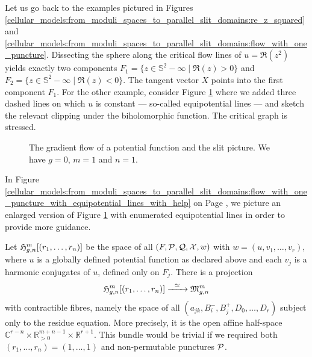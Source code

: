 Let us go back to the examples pictured in Figures \ref{cellular_models:from_moduli_spaces_to_parallel_slit_domains:re_z_squared} and
\ref{cellular_models:from_moduli_spaces_to_parallel_slit_domains:flow_with_one_puncture}.
Dissecting the sphere along the critical flow lines of $u = \Re(z^2)$ yields exactly two components $F_1  = \{ z \in \mathbb S^2 - \infty \mid \Re(z) > 0\}$ and $F_2 = \{ z \in \mathbb S^2 - \infty \mid \Re(z) < 0\}$.
The tangent vector $X$ points into the first component $F_1$.
For the other example, consider Figure \ref{cellular_models:from_moduli_spaces_to_parallel_slit_domains:flow_with_one_puncture_with_equipotential_lines}
where we added three dashed lines on which $u$ is constant --- so-called equipotential lines --- and sketch the relevant clipping under the biholomorphic function.
The critical graph is stressed.
\begin{figure}[ht]
    \centering
    \def\svgwidth{.72\columnwidth}
    \raisebox{-0.5\height}{}
    \hfill
    \def\svgwidth{.26\columnwidth}
    \raisebox{-0.5\height}{}
    \caption{
        \label{cellular_models:from_moduli_spaces_to_parallel_slit_domains:flow_with_one_puncture_with_equipotential_lines}
        The gradient flow of a potential function and the slit picture.
        We have $g=0$, $m=1$ and $n=1$.}
\end{figure}
In Figure \ref{cellular_models:from_moduli_spaces_to_parallel_slit_domains:flow_with_one_puncture_with_equipotential_lines_with_help} on Page \pageref{page:huge_picture_flow},
we picture an enlarged version of Figure \ref{cellular_models:from_moduli_spaces_to_parallel_slit_domains:flow_with_one_puncture_with_equipotential_lines}
with enumerated equipotential lines in order to provide more guidance.

Let $\Harmr$ be the space of all $(F, \mathcal{P}, \mathcal{Q}, \mathcal{X}, w)$ with $w = (u, v_1, \ldots, v_r)$, where
$u$ is a globally defined potential function as declared above and each $v_j$ is a harmonic conjugates of $u$, defined only on $F_j$.
There is a projection
\[
    \Harmr \xr{\simeq} \Modspc
\]
with contractible fibres,
namely the space of all $(a_{jk}, B^-_i, B^+_j, D_0, \ldots, D_r)$ subject only to the residue equation.
More precisely, it is the open affine half-space $\mathbb C^{r-n} \times \mathbb R^{m+n-1}_{>0} \times \mathbb R^{r+1}$.
This bundle would be trivial if we required both $(r_1, \ldots, r_n) = (1, \ldots, 1)$ and non-permutable punctures $\mathcal{P}$.

